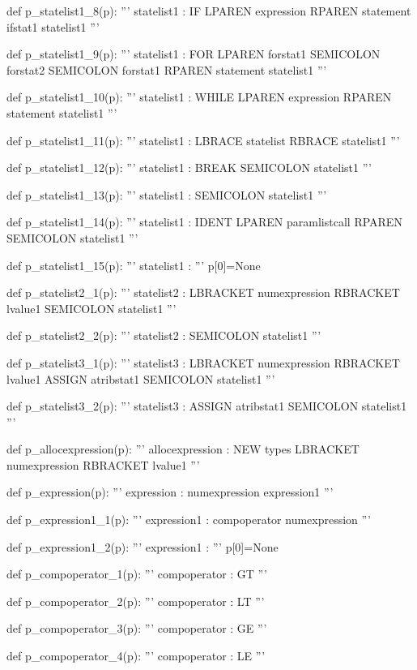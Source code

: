 \documentclass[
	12pt,				%
	openright,			%
	twoside,			%
	a4paper,			%
	english,			%
	french,				%
	spanish,			%
	brazil				%
	]{abntex2}
\begin{document}
\begin{python}
def p_statelist1_8(p):
    '''
    statelist1 : IF LPAREN expression RPAREN statement ifstat1 statelist1
    '''

def p_statelist1_9(p):
    '''
    statelist1 : FOR LPAREN forstat1 SEMICOLON forstat2 SEMICOLON forstat1 RPAREN statement statelist1
    '''

def p_statelist1_10(p):
    '''
    statelist1 : WHILE LPAREN expression RPAREN statement statelist1
    '''

def p_statelist1_11(p):
    '''
    statelist1 : LBRACE statelist RBRACE statelist1
    '''

def p_statelist1_12(p):
    '''
    statelist1 : BREAK SEMICOLON statelist1
    '''

def p_statelist1_13(p):
    '''
    statelist1 : SEMICOLON statelist1
    '''

def p_statelist1_14(p):
    '''
    statelist1 : IDENT LPAREN paramlistcall RPAREN SEMICOLON statelist1
    '''

def p_statelist1_15(p):
    '''
    statelist1 : 
    '''
    p[0]=None

def p_statelist2_1(p):
    '''
    statelist2 : LBRACKET numexpression RBRACKET lvalue1 SEMICOLON statelist1
    '''

def p_statelist2_2(p):
    '''
    statelist2 : SEMICOLON statelist1
    '''

def p_statelist3_1(p):
    '''
    statelist3 : LBRACKET numexpression RBRACKET lvalue1 ASSIGN atribstat1 SEMICOLON statelist1
    '''

def p_statelist3_2(p):
    '''
    statelist3 : ASSIGN atribstat1 SEMICOLON statelist1
    '''

def p_allocexpression(p):
    '''
    allocexpression : NEW types LBRACKET numexpression RBRACKET lvalue1
    '''

def p_expression(p):
    '''
    expression : numexpression expression1
    '''

def p_expression1_1(p):
    '''
    expression1 : compoperator numexpression
    '''

def p_expression1_2(p):
    '''
    expression1 : 
    '''
    p[0]=None

def p_compoperator_1(p):
    '''
    compoperator : GT
    '''

def p_compoperator_2(p):
    '''
    compoperator : LT
    '''

def p_compoperator_3(p):
    '''
    compoperator : GE
    '''

def p_compoperator_4(p):
    '''
    compoperator : LE
    '''


\end{python}
\end{document}
